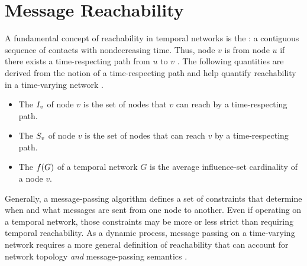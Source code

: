 %
%

\section{Message Reachability}\label{sec:reachability}
A fundamental concept of reachability in temporal networks is the : a contiguous sequence of contacts with nondecreasing time. Thus, node $v$ is  from node $u$ if there exists a time-respecting path from $u$ to $v$ \citep{Moody2002}. The following quantities are derived from the notion of a time-respecting path and help quantify reachability in a time-varying network \citep{Holme2012}.
%
\begin{itemize}
    \item The  $I_v$ of node $v$ is the set of nodes that $v$ can reach by a time-respecting path.
    \item The  $S_v$ of node $v$ is the set of nodes that can reach $v$ by a time-respecting path.
    \item The  $f(G)$ of a temporal network $G$ is the average influence-set cardinality of a node $v$.
\end{itemize}

Generally, a message-passing algorithm defines a set of constraints that determine when and what messages are sent from one node to another. Even if operating on a temporal network, those constraints may be more or less strict than requiring temporal reachability. As a dynamic process, message passing on a time-varying network requires a more general definition of reachability that can account for network topology \emph{and} message-passing semantics \citep{Barrat2013}.

